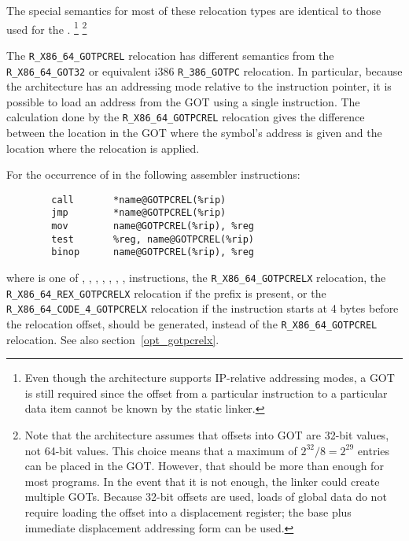 The special semantics for most of these relocation types are identical
to those used for the \intelabi.  \footnote{Even though
  the \xARCH architecture supports IP-relative addressing modes, a GOT
  is still required since the offset from a particular instruction to
  a particular data item cannot be known by the static linker.}
\footnote{Note that the \xARCH architecture assumes that offsets into
  GOT are 32-bit values, not 64-bit values.  This choice means that a
  maximum of $2^{32}/8 = 2^{29}$ entries can be placed in the GOT.
  However, that should be more than enough for most programs.  In the
  event that it is not enough, the linker could create multiple GOTs.
  Because 32-bit offsets are used, loads of global data do not require
  loading the offset into a displacement register; the base plus
  immediate displacement addressing form can be used.}

\begin{sloppypar}
The \texttt{R_X86_64_GOTPCREL} relocation has different semantics from the
\texttt{R_X86_64_GOT32} or equivalent i386 \texttt{R_386_GOTPC} relocation.
In particular, because the \xARCH architecture has an addressing mode relative
to the instruction pointer, it is possible to load an address from the GOT
using a single instruction.  The calculation done by the
\texttt{R_X86_64_GOTPCREL} relocation gives the difference between the location
in the GOT where the symbol's address is given and the location where the
relocation is applied.
\end{sloppypar}

For the occurrence of  in the following assembler
instructions:

\begin{footnotesize}
\begin{verbatim}
        call       *name@GOTPCREL(%rip)
        jmp        *name@GOTPCREL(%rip)
        mov        name@GOTPCREL(%rip), %reg
        test       %reg, name@GOTPCREL(%rip)
        binop      name@GOTPCREL(%rip), %reg
\end{verbatim}
\end{footnotesize}

\noindent
\begin{sloppypar}
where  is one of , , ,
, , , , 
instructions, the \texttt{R_X86_64_GOTPCRELX} relocation,
the \texttt{R_X86_64_REX_GOTPCRELX} relocation if the
 prefix is present, or the \texttt{R_X86_64_CODE_4_GOTPCRELX}
relocation if the instruction starts at 4 bytes before the relocation
offset, should be generated, instead of the \texttt{R_X86_64_GOTPCREL}
relocation.  See also section~\ref{opt_gotpcrelx}.
\end{sloppypar}


